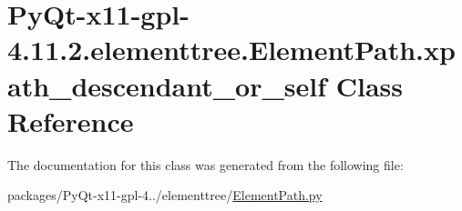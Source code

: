 \hypertarget{classPyQt-x11-gpl-4_811_82_1_1elementtree_1_1ElementPath_1_1xpath__descendant__or__self}{}\section{Py\+Qt-\/x11-\/gpl-\/4.11.2.elementtree.\+Element\+Path.\+xpath\+\_\+descendant\+\_\+or\+\_\+self Class Reference}
\label{classPyQt-x11-gpl-4_811_82_1_1elementtree_1_1ElementPath_1_1xpath__descendant__or__self}


The documentation for this class was generated from the following file\+:\begin{DoxyCompactItemize}
\item 
packages/\+Py\+Qt-\/x11-\/gpl-\/4../elementtree/\hyperlink{ElementPath_8py}{Element\+Path.\+py}\end{DoxyCompactItemize}
